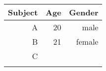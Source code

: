 \documentclass{article}
\begin{document}
 


\begin{tabular}{|r|r|r|} %
\hline %
Subject	& Age	& Gender	\\ %
\hline\hline
A		& 20		& male	\\
B		&21		&female	\\
C		& & \\
& & \\				
\hline
\end{tabular}
\end{document}

